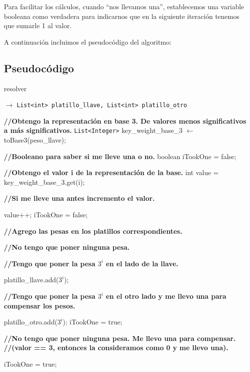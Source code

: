 Para facilitar los cálculos, cuando ``nos llevamos una'', establecemos una variable booleana como verdadera para indicarnos que en la siguiente iteración tenemos que sumarle 1 al valor.

A continuación incluimos el pseudocódigo del algoritmo:


\subsection{Pseudocódigo}

\begin{algorithm}[h]
\caption{resolver}
\begin{algorithmic}[1]
   $\to $ \texttt{List<int> platillo\_llave, List<int> platillo\_otro}
  
  
    \State \textbf{//Obtengo la representación en base 3. De valores menos significativos a más significativos.}
	\State \texttt{List<Integer>} key\_weight\_base\_3 $\gets$ toBase3(peso\_llave);	
	
	\State
    \State \textbf{//Booleano para saber si me lleve una o no.}
	\State boolean iTookOne = false;					
	
    \State 

		\State \textbf{//Obtengo el valor i de la representación de la base.}
		\State int value = key\_weight\_base\_3.get(i);		
		
		\State 
		\State \textbf{//Si me lleve una antes incremento el valor.}
		
			\State value++;				
			\State iTookOne = false;
			
		\EndIf
		
		\State 
		\State \textbf{//Agrego las pesas en los platillos correspondientes.}
		
			\State \textbf{//No tengo que poner ninguna pesa.}
			\State 
			
	
			\State \textbf{//Tengo que poner la pesa $3^i$ en el lado de la llave.}
			
		    \State platillo\_llave.add($3^i$);
		    \State 
			
			\State \textbf{//Tengo que poner la pesa $3^i$ en el otro lado y me llevo una para compensar los pesos.}
				
			\State platillo\_otro.add($3^i$);
			\State iTookOne = true;	
			\State 
			
		\Else
			\State \textbf{//No tengo que poner ninguna pesa. Me llevo una para compensar.}
			\State \textbf{//(valor == 3, entonces la consideramos como 0 y me llevo una).}
			
			\State iTookOne = true;
			
		\EndIf	
	
	\EndFor
	
 \EndProcedure
 
\end{algorithmic}
\end{algorithm}



